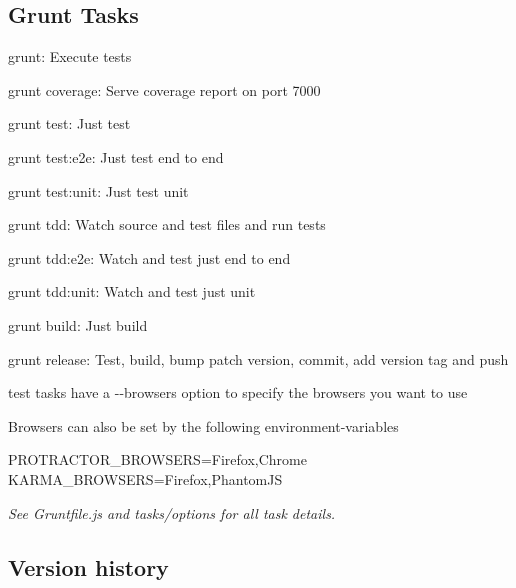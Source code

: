 \subsection*{Grunt Tasks }


\begin{DoxyItemize}
\item {\ttfamily grunt}\+: Execute tests
\item {\ttfamily grunt coverage}\+: Serve coverage report on port 7000
\item {\ttfamily grunt test}\+: Just test
\item {\ttfamily grunt test\+:e2e}\+: Just test end to end
\item {\ttfamily grunt test\+:unit}\+: Just test unit
\item {\ttfamily grunt tdd}\+: Watch source and test files and run tests
\item {\ttfamily grunt tdd\+:e2e}\+: Watch and test just end to end
\item {\ttfamily grunt tdd\+:unit}\+: Watch and test just unit
\item {\ttfamily grunt build}\+: Just build
\item {\ttfamily grunt release}\+: Test, build, bump patch version, commit, add version tag and push
\end{DoxyItemize}

{\ttfamily test} tasks have a {\ttfamily -\/-\/browsers} option to specify the browsers you want to use

Browsers can also be set by the following environment-\/variables 
\begin{DoxyCode}
PROTRACTOR\_BROWSERS=Firefox,Chrome
KARMA\_BROWSERS=Firefox,PhantomJS
\end{DoxyCode}


{\itshape See Gruntfile.\+js and tasks/options for all task details.}

\subsection*{Version history }


